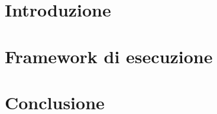 \documentclass[a4paper,12pt,draft]{article}
\begin{document}


\begingroup
	\hypersetup{linkcolor=black}
	\setcounter{tocdepth}{2}
	\tableofcontents
\endgroup

\newpage

\section{Introduzione}


\cite{lmvTabu}

\section{Framework di esecuzione}


\section{Conclusione}



{}


\end{document}
